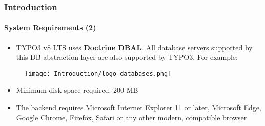 \begin{frame}[fragile]
	\frametitle{Introduction}
	\framesubtitle{System Requirements (2)}

	\begin{itemize}
		\item TYPO3 v8 LTS uses \textbf{Doctrine DBAL}. All database servers
			supported by this DB abstraction layer are also supported by TYPO3.\newline
			For example:
	\end{itemize}

	\vspace{-0.4cm}
	\begin{figure}
		\texttt{[image: Introduction/logo-databases.png]}
	\end{figure}

	\begin{itemize}

		\item Minimum disk space required: 200 MB
		\item The backend requires Microsoft Internet Explorer 11 or later,
			Microsoft Edge, Google Chrome, Firefox, Safari or any other modern,
			compatible browser

	\end{itemize}

\end{frame}


